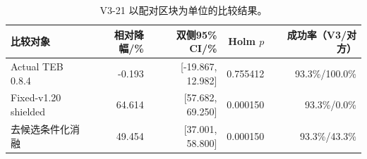 \begin{table}[htbp]
\centering
\caption{V3-21 以配对区块为单位的比较结果。}
\label{tab:v321-comparisons}
\small
\begin{tabular}{lrrrr}
\toprule
比较对象 & 相对降幅/\% & 双侧95\% CI/\% & Holm $p$ & 成功率（V3/对方）\\
\midrule
Actual TEB 0.8.4 & -0.193 & [-19.867, 12.982] & 0.755412 & 93.3\%/100.0\%\\
Fixed-v1.20 shielded & 64.614 & [57.682, 69.250] & 0.000150 & 93.3\%/0.0\%\\
去候选条件化消融 & 49.454 & [37.001, 58.800] & 0.000150 & 93.3\%/43.3\%\\
\bottomrule
\end{tabular}
\end{table}
